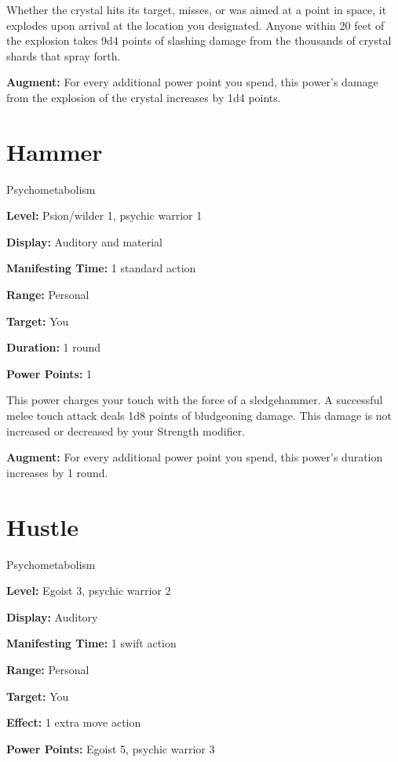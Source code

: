 \documentclass{article}
\begin{document}
Whether the crystal hits its target, misses, or was aimed at a point in space, 
it explodes upon arrival at the location you designated. Anyone within 20 feet 
of the explosion takes 9d4 points of slashing damage from the thousands of crystal 
shards that spray forth.

\textbf{Augment:} For every additional power point you spend, this power's damage 
from the explosion of the crystal increases by 1d4 points.

\vspace{12pt}
\section*{Hammer}

Psychometabolism

\textbf{Level:} Psion/wilder 1, psychic warrior 1

\textbf{Display:} Auditory and material

\textbf{Manifesting Time:} 1 standard action

\textbf{Range:} Personal

\textbf{Target:} You

\textbf{Duration:} 1 round

\textbf{Power Points:} 1

This power charges your touch with the force of a sledgehammer. A successful melee 
touch attack deals 1d8 points of bludgeoning damage. This damage is not increased 
or decreased by your Strength modifier.

\textbf{Augment:} For every additional power point you spend, this power's duration 
increases by 1 round.

\vspace{12pt}
\section*{Hustle}

Psychometabolism

\textbf{Level:} Egoist 3, psychic warrior 2

\textbf{Display:} Auditory

\textbf{Manifesting Time:} 1 swift action

\textbf{Range:} Personal

\textbf{Target:} You

\textbf{Effect:} 1 extra move action

\textbf{Power Points:} Egoist 5, psychic warrior 3
\end{document}
